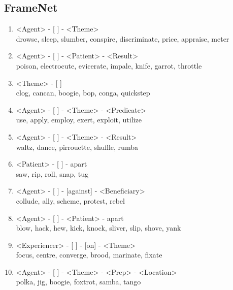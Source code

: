 \documentclass[11pt,a4paper,twocolumn]{article}
\begin{document}
	\subsection{FrameNet}
		\begin{enumerate}
			\item <Agent> - [ ] - <Theme>\\
			drowse, sleep, slumber, conspire, discriminate, price, appraise, meter
		
			\item <Agent> - [ ] - <Patient> - <Result>\\
			poison, electrocute, evicerate, impale, knife, garrot, throttle	
			
			\item <Theme> - [ ]\\
			clog, cancan, boogie, bop, conga, quickstep
			
			\item <Agent> - [ ] - <Theme> - <Predicate>\\
			use, apply, employ, exert, exploit, utilize	
			
			\item <Agent> - [ ] - <Theme> - <Result>\\
			waltz, dance, pirrouette, shuffle, rumba
			
			\item <Patient> - [ ] - apart\\
			saw, rip, roll, snap, tug	
			
			\item <Agent> - [ ] - [against] - <Beneficiary>\\
			collude, ally, scheme, protest, rebel
			
			\item <Agent> - [ ] - <Patient> - apart\\
			blow, hack, hew, kick, knock, sliver, slip, shove, yank
			
			\item <Experiencer> - [ ] - [on] - <Theme>\\
			focus, centre, converge, brood, marinate, fixate
			
			\item <Agent> - [ ] - <Theme> - <Prep> - <Location>\\
			polka, jig, boogie, foxtrot, samba, tango
			
		\end{enumerate}
	
	
\end{document}
